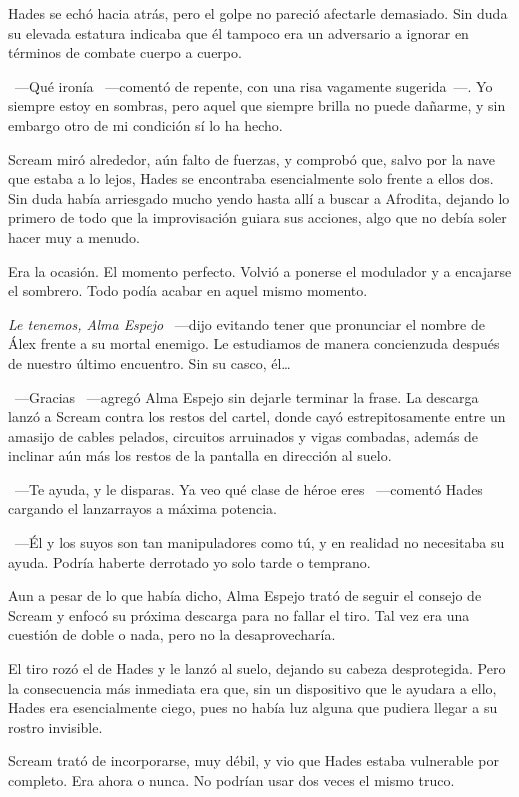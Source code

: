 Hades se echó hacia atrás, pero el golpe no pareció afectarle demasiado. Sin duda su elevada estatura indicaba que él tampoco era un adversario a ignorar en términos de combate cuerpo a cuerpo.

~---Qué ironía ~---comentó de repente, con una risa vagamente sugerida~---. Yo siempre estoy en sombras, pero aquel que siempre brilla no puede dañarme, y sin embargo otro de mi condición sí lo ha hecho.

Scream miró alrededor, aún falto de fuerzas, y comprobó que, salvo por la nave que estaba a lo lejos, Hades se encontraba esencialmente solo frente a ellos dos. Sin duda había arriesgado mucho yendo hasta allí a buscar a Afrodita, dejando lo primero de todo que la improvisación guiara sus acciones, algo que no debía soler hacer muy a menudo.

Era la ocasión. El momento perfecto. Volvió a ponerse el modulador y a encajarse el sombrero. Todo podía acabar en aquel mismo momento.

\emph{Le tenemos, Alma Espejo} ~---dijo evitando tener que pronunciar el nombre de Álex frente a su mortal enemigo. Le estudiamos de manera concienzuda después de nuestro último encuentro. Sin su casco, él\dots

~---Gracias ~---agregó Alma Espejo sin dejarle terminar la frase. La descarga lanzó a Scream contra los restos del cartel, donde cayó estrepitosamente entre un amasijo de cables pelados, circuitos arruinados y vigas combadas, además de inclinar aún más los restos de la pantalla en dirección al suelo.

~---Te ayuda, y le disparas. Ya veo qué clase de héroe eres ~---comentó Hades cargando el lanzarrayos a máxima potencia.

~---Él y los suyos son tan manipuladores como tú, y en realidad no necesitaba su ayuda. Podría haberte derrotado yo solo tarde o temprano.

Aun a pesar de lo que había dicho, Alma Espejo trató de seguir el consejo de Scream y enfocó su próxima descarga para no fallar el tiro. Tal vez era una cuestión de doble o nada, pero no la desaprovecharía.

El tiro rozó el  de Hades y le lanzó al suelo, dejando su cabeza desprotegida. Pero la consecuencia más inmediata era que, sin un dispositivo que le ayudara a ello, Hades era esencialmente ciego, pues no había luz alguna que pudiera llegar a su rostro invisible.

Scream trató de incorporarse, muy débil, y vio que Hades estaba vulnerable por completo. Era ahora o nunca. No podrían usar dos veces el mismo truco.

